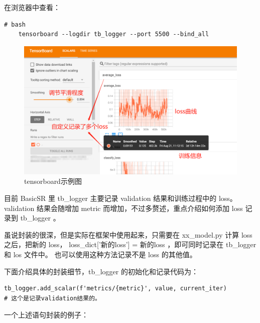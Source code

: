 \documentclass[../main.tex]{subfiles}
\begin{document}
在浏览器中查看：
\begin{verbatim}
# bash
    tensorboard --logdir tb_logger --port 5500 --bind_all
\end{verbatim}

\begin{figure}[h]
    \begin{center}
        \includegraphics[width=0.8\linewidth]{figures/tensorboard_demo.png}
        \caption{tensorboard示例图}
        \label{fig:tensorboard_demo}
    \end{center}
\end{figure}

目前 BasicSR 里 tb\_logger 主要记录 validation 结果和训练过程中的 loss。validation 结果会随增加 metric 而增加，不过多赘述，重点介绍如何添加 loss 记录到 tb\_logger 。

\begin{hl} %
虽说封装的很深，但是实际在框架中使用起来，只需要在 xx\_model.py 计算 loss 之后，把新的 loss， loss\_dict['新的loss'] = 新的loss ，即可同时记录在 tb\_logger 和 los 文件中。
也可以使用这种方法记录不是 loss 的其他值。
\end{hl}

下面介绍具体的封装细节，tb\_logger 的初始化和记录代码为：

\begin{verbatim}
tb_logger.add_scalar(f'metrics/{metric}', value, current_iter)
# 这个是记录validation结果的。
\end{verbatim}

一个上述语句封装的例子：
\end{document}
